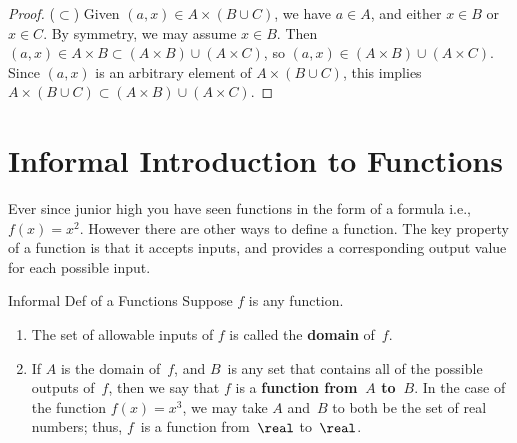 \documentclass[../MATH-2000-Notes.tex]{subfiles}
\begin{document}
\begin{Answers}
\begin{proof}
        ($\subset$) Given $(a,x) \in A \times (B \cup C)$, we have $a \in A$, and either $x \in B$ or $x \in C$. By symmetry, we may assume $x \in B$. Then $(a,x) \in A \times B \subset (A \times B) \cup (A \times C)$, so $(a,x) \in (A \times B) \cup (A \times C)$.
        Since $(a,x)$ is an arbitrary element of $A \times (B \cup C)$, this implies $A \times (B \cup C) \subset (A \times B) \cup (A \times C)$.
    \end{proof}
\end{Answers}

\section{Informal Introduction to Functions}
Ever since junior high you have seen functions in the form of a formula i.e., \(f(x)  = x^2\). However there are other ways to define a function. The key property of a function is that it accepts inputs, and provides a corresponding output value for each possible input.

\begin{Definition}
    {Informal Def of a Functions}
    Suppose $f$ is any function.
    \begin{enumerate}
        \item The set of allowable inputs of $f$ is called the \textbf{domain} of~$f$.
        \item If $A$ is the domain of~$f$, and $B$~is any set that contains all of the possible outputs of~$f$, then we say that $f$ is a \textbf{function from~$A$ to~$B$}. In the case of the function $f(x) = x^3$, we may take $A$ and~$B$ to both be the set of real numbers; thus, $f$~is a function from~$\real$ to~$\real$.
    \end{enumerate}
\end{Definition}
\end{document}
